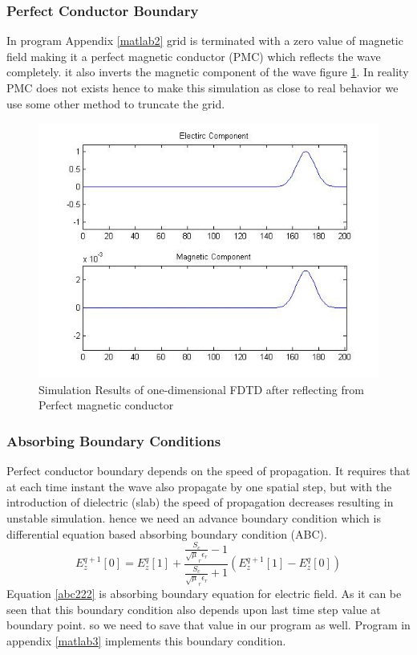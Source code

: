 \subsubsection{Perfect Conductor Boundary}
In program Appendix \ref{matlab2}
grid is terminated with a zero value of magnetic field
making it a perfect magnetic conductor (PMC) which reflects the wave completely. it also inverts the magnetic component of the wave figure \ref{fig:pmc}. In reality PMC does not exists hence to make this simulation as close to real behavior we use some other method to truncate the grid.
\begin{figure}[htbp]
	\centering
		\includegraphics[width=5in]{Figures/pmc.jpg}
	\caption[Simulation Result of 1 dimensional FDTD in free space with Perfect magnetic conductor boundary]{Simulation Results of one-dimensional FDTD after reflecting from Perfect magnetic conductor}
	\label{fig:pmc}
\end{figure}
\subsubsection{Absorbing Boundary Conditions}
Perfect conductor boundary depends on the speed of propagation. It requires that at each time instant the wave also propagate by one spatial step, but with the introduction of dielectric (slab) the speed of propagation decreases resulting in unstable simulation. hence we need an advance boundary condition which is differential equation based absorbing boundary condition (ABC).
\begin{equation}
	E_z^{q+1} \left[ 0 \right] = E_z^q \left[ 1 \right] + \frac {\frac{S_c}{\sqrt\mu_r\epsilon_r}-1} {\frac{S_c}{\sqrt\mu_r\epsilon_r}+1} \left( E_z^{q+1} \left[ 1 \right] - E_z^q \left[ 0 \right]  \right)
\label{abc222}
\end{equation}
Equation \eqref{abc222} is absorbing boundary equation
for electric field. As it can be seen that this boundary condition also depends upon last time step value at boundary point. so we need to save that value in our program as well.
Program in appendix \ref{matlab3}
implements this boundary condition.

